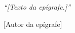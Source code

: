 \begin{epigrafe}
	\vspace*{\fill}
	\begin{flushright}
		\textit{``[Texto da epígrafe.]''}

		[Autor da epígrafe]
	\end{flushright}
\end{epigrafe}
